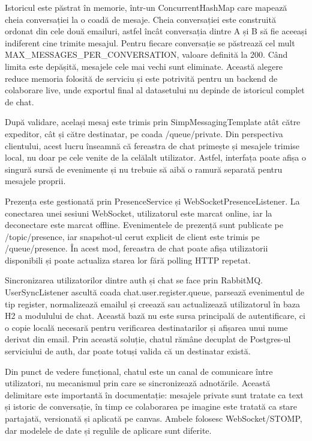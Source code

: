 Istoricul este păstrat în memorie, într-un ConcurrentHashMap care mapează cheia conversației la o coadă de mesaje. Cheia conversației este construită ordonat din cele două emailuri, astfel încât conversația dintre A și B să fie aceeași indiferent cine trimite mesajul. Pentru fiecare conversație se păstrează cel mult MAX\_MESSAGES\_PER\_CONVERSATION, valoare definită la 200. Când limita este depășită, mesajele cele mai vechi sunt eliminate. Această alegere reduce memoria folosită de serviciu și este potrivită pentru un backend de colaborare live, unde exportul final al datasetului nu depinde de istoricul complet de chat.

După validare, același mesaj este trimis prin SimpMessagingTemplate atât către expeditor, cât și către destinatar, pe coada /queue/private. Din perspectiva clientului, acest lucru înseamnă că fereastra de chat primește și mesajele trimise local, nu doar pe cele venite de la celălalt utilizator. Astfel, interfața poate afișa o singură sursă de evenimente și nu trebuie să aibă o ramură separată pentru mesajele proprii.

Prezența este gestionată prin PresenceService și WebSocketPresenceListener. La conectarea unei sesiuni WebSocket, utilizatorul este marcat online, iar la deconectare este marcat offline. Evenimentele de prezență sunt publicate pe /topic/presence, iar snapshot-ul cerut explicit de client este trimis pe /queue/presence. În acest mod, fereastra de chat poate afișa utilizatorii disponibili și poate actualiza starea lor fără polling HTTP repetat.

Sincronizarea utilizatorilor dintre auth și chat se face prin RabbitMQ. UserSyncListener ascultă coada chat.user.register.queue, parsează evenimentul de tip register, normalizează emailul și creează sau actualizează utilizatorul în baza H2 a modulului de chat. Această bază nu este sursa principală de autentificare, ci o copie locală necesară pentru verificarea destinatarilor și afișarea unui nume derivat din email. Prin această soluție, chatul rămâne decuplat de Postgres-ul serviciului de auth, dar poate totuși valida că un destinatar există.

Din punct de vedere funcțional, chatul este un canal de comunicare între utilizatori, nu mecanismul prin care se sincronizează adnotările. Această delimitare este importantă în documentație: mesajele private sunt tratate ca text și istoric de conversație, în timp ce colaborarea pe imagine este tratată ca stare partajată, versionată și aplicată pe canvas. Ambele folosesc WebSocket/STOMP, dar modelele de date și regulile de aplicare sunt diferite.

